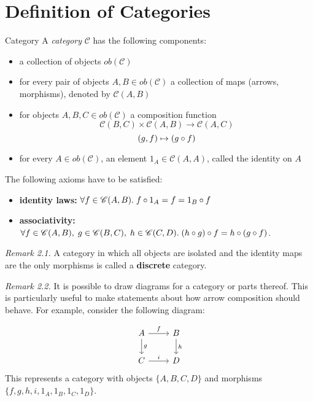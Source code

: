 \section {Definition of Categories}
\begin{definition}{Category}
	A \emph{category} $\mathscr{C}$ has the following components:
	\begin{itemize}
  
		\item a collection of objects $ob(\mathscr{C})$
		\item for every pair of objects $A, B \in ob(\mathscr{C})$ a collection of maps (arrows, morphisms), denoted by $\mathscr{C}(A, B)$
		\item for objects $A, B, C \in ob(\mathscr{C})$ a composition function
		\[\mathscr{C}(B, C) \times \mathscr{C}(A, B) \rightarrow  \mathscr{C}(A, C)
		\]		\[ (g,f) \mapsto (g \mathbin{\circ} f)
		\]
		\item for every $A \in ob(\mathscr{C})$, an element $1_A \in \mathscr{C}(A, A)$, called the identity on $A$ 

 	\end{itemize}
 The following axioms have to be satisfied:
 \begin{itemize}
 	\item \textbf{identity laws:} $\forall f \in \mathscr{C}(A, B). \; f \mathbin{\circ} 1_A = f = 1_B \mathbin{\circ} f$ 
 	\item \textbf{associativity:} $\forall f \in \mathscr{C}(A, B), \; g \in \mathscr{C}(B, C), \; h \in \mathscr{C}(C, D). \; (h \mathbin{\circ} g) \mathbin{\circ} f = h \mathbin{\circ} (g \mathbin{\circ} f) $.
 \end{itemize}
\end{definition}
    \textit{Remark 2.1.} A category in which all objects are isolated and the identity maps are the only morphisms is called a \textbf{discrete} category.


\textit{Remark 2.2.}
It is possible to draw diagrams for a category or parts thereof. This is particularly useful to make statements about how arrow composition should behave. For example, consider the following diagram:


\[
  \begin{tikzcd}
    A \arrow{r}{f} \arrow{d}{g} & B \arrow{d}{h} \\
    C \arrow{r}{i}              & D 
  \end{tikzcd}
\]
This represents a category with objects $\{A, B, C, D\}$ and
morphisms $\{f, g, h, i, 1_A, 1_B, 1_C, 1_D \}$.


